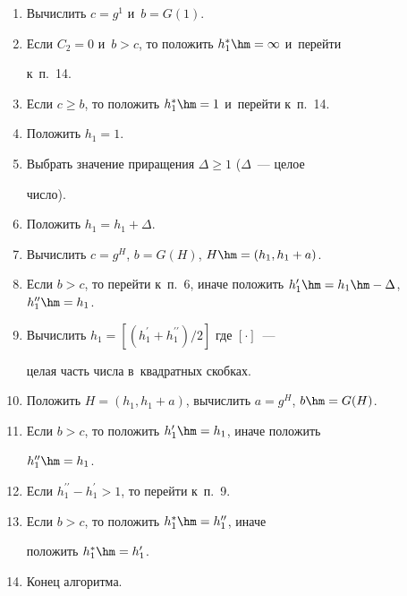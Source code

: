 \begin{enumerate}[1.]


\item Вычислить  $c=g^1$ и~$b=G(1)$.


\item Если $C_2=0$ и~$b>c$, то положить $h_1^*\hm=\infty$ и~перейти 


к~п.~14.


\item Если $c\geq b$, то положить $h_1^*\hm=1$ и~перейти к~п.~14.


\item Положить $h_1=1$.


\item Выбрать значение приращения $\Delta \geq 1$ ($\Delta$~--- целое 


число).


\item Положить $h_1=h_1+\Delta$.


\item Вычислить $c=g^H$, $b=G(H)$, $H\hm= (h_1,h_1+a)$. 


\item Если $b>c$, то перейти к~п.~6, иначе положить $h_1^\prime\hm= h_1\hm- 


\Delta$, $h_1^{\prime\prime} \hm= h_1$.


\item Вычислить $h_1= [(h_1^\prime+h_1^{\prime\prime})/2]$ где $[\cdot]$~--- 


целая часть числа в~квадратных скобках.


\item Положить $H=(h_1,h_1+a)$, вычислить $a=g^H$, $b\hm=G(H)$.


\item Если $b>c$, то положить $h_1^\prime\hm= h_1$, иначе положить 


$h_1^{\prime\prime} \hm=h_1$.


\item Если $h_1^{\prime\prime} -h_1^\prime>1$, то перейти к~п.~9. 


\item Если $b>c$, то положить $h_1^*\hm= h_1^{\prime\prime}$, иначе 


положить $h_1^*\hm= h_1^\prime$. 


\item Конец алгоритма.


\end{enumerate}


